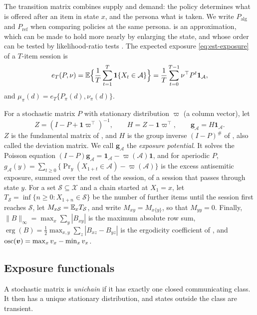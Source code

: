 The transition matrix combines supply and demand: the policy determines what is offered after an item in state $x$, and the persona what is taken. We write $P_{\mathrm{alg}}$ and $P_{\mathrm{ref}}$ when comparing policies at the same persona.  is an approximation, which can be made to hold more nearly by enlarging the state, and whose order can be tested by likelihood-ratio tests \citep{anderson1957}. The expected exposure \eqref{eq:est-exposure} of a $T$-item session is
\begin{equation}\label{eq:mk-eT}
  e_T(P,\nu)=\mathbb{E}\Bigl\{\frac1T\sum_{t=1}^{T}\mathbf{1}\!\left\{X_t\in\mathcal A\right\}\Bigr\}=\frac1T\sum_{t=0}^{T-1}\nu^{\top}P^{t}\bm1_{\mathcal A},
\end{equation}
and $\mu_\pi(d)=e_T\{P_\pi(d),\nu_\pi(d)\}$.

For a stochastic matrix $P$ with stationary distribution $\varpi$ (a column vector), let
\[
  Z=(I-P+\bm1\varpi^{\top})^{-1},\qquad H=Z-\bm1\varpi^{\top},\qquad \bm g_{\mathcal A}=H\bm1_{\mathcal A}.
\]
$Z$ is the fundamental matrix of \citet{kemeny1960}, and $H$ is the group inverse $(I-P)^{\#}$ of \citet{meyer1975}, also called the deviation matrix. We call $\bm g_{\mathcal A}$ the \emph{exposure potential}. It solves the Poisson equation $(I-P)\bm g_{\mathcal A}=\bm1_{\mathcal A}-\varpi(\mathcal A)\bm1$, and for aperiodic $P$, $g_{\mathcal A}(y)=\sum_{t\ge0}\{\Pr_y(X_{1+t}\in\mathcal A)-\varpi(\mathcal A)\}$ is the excess antisemitic exposure, summed over the rest of the session, of a session that passes through state $y$. For a set $\mathcal S\subseteq\mathcal X$ and a chain started at $X_1=x$, let $T_{\mathcal S}=\inf\{n\ge0:X_{1+n}\in\mathcal S\}$ be the number of further items until the session first reaches $\mathcal S$, let $M_{x\mathcal S}=\mathbb{E}_xT_{\mathcal S}$, and write $M_{xy}=M_{x\{y\}}$, so that $M_{yy}=0$. Finally, $\|B\|_\infty=\max_x\sum_y|B_{xy}|$ is the maximum absolute row sum, $\operatorname{erg}(B)=\frac12\max_{x,y}\sum_z|B_{xz}-B_{yz}|$ is the ergodicity coefficient of \citet{seneta2006}, and $\operatorname{osc}(\bm v)=\max_xv_x-\min_xv_x$.

\subsection{Exposure functionals}\label{sec:markov-functionals}

A stochastic matrix is \emph{unichain} if it has exactly one closed communicating class. It then has a unique stationary distribution, and states outside the class are transient.

